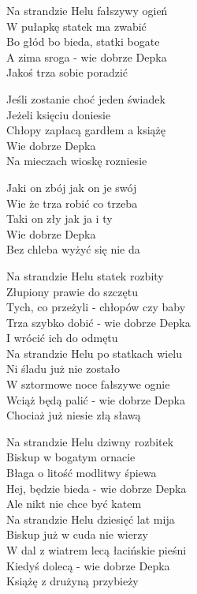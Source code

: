 \begin{text}
    \begin{scriptTwelve}
    Na strandzie Helu fałszywy ogień\\
    W pułapkę statek ma zwabić\\
    Bo głód bo bieda, statki bogate\\
    A zima sroga - wie dobrze Depka\\
    Jakoś trza sobie poradzić

    \vin Jeśli zostanie choć jeden świadek\\
    \vin Jeżeli księciu doniesie\\
    \vin Chłopy zapłacą gardłem a książę\\
    \vin Wie dobrze Depka\\
    \vin Na mieczach wioskę rozniesie

    \vin Jaki on zbój jak on je swój\\
    \vin Wie że trza robić co trzeba\\
    \vin Taki on zły jak ja i ty\\
    \vin Wie dobrze Depka\\
    \vin Bez chleba wyżyć się nie da

    Na strandzie Helu statek rozbity\\
    Złupiony prawie do szczętu\\
    Tych, co przeżyli - chłopów czy baby\\
    Trza szybko dobić - wie dobrze Depka\\
    I wrócić ich do odmętu\\
    \vin Na strandzie Helu po statkach wielu\\
    \vin Ni śladu już nie zostało\\
    \vin W sztormowe noce fałszywe ognie\\
    \vin Wciąż będą palić - wie dobrze Depka\\
    \vin Chociaż już niesie złą sławą

    Na strandzie Helu dziwny rozbitek\\
    Biskup w bogatym ornacie\\
    Błaga o litość modlitwy śpiewa\\
    Hej, będzie bieda - wie dobrze Depka\\
    Ale nikt nie chce być katem\\
    \vin Na strandzie Helu dziesięć lat mija\\
    \vin Biskup już w cuda nie wierzy\\
    \vin W dal z wiatrem lecą łacińskie pieśni\\
    \vin Kiedyś dolecą - wie dobrze Depka\\
    \vin Książę z drużyną przybieży


\end{scriptTwelve}
\end{text}

